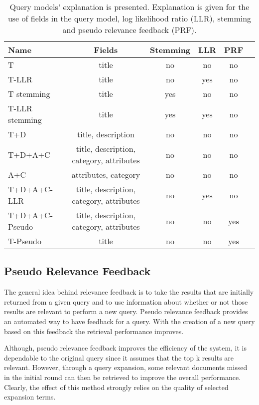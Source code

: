\begin{table}[H]
\begin{center}
\scriptsize
\caption{Query models' explanation is presented. Explanation is given for the use of fields in the query model, log likelihood ratio (LLR), stemming and pseudo relevance feedback (PRF).}
\begin{tabular}{lccccr}
\midrule
Name & Fields & Stemming & LLR & PRF \\
\midrule
T & title & no & no & no \\
T-LLR & title & no & yes & no \\
T stemming & title & yes & no & no \\
T-LLR stemming & title & yes & yes & no \\
T+D  & title, description & no & no & no \\
T+D+A+C & title, description, category, attributes & no & no & no \\
A+C & attributes, category & no & no & no \\
T+D+A+C-LLR & title, description, category, attributes & no & yes & no \\
T+D+A+C-Pseudo & title, description, category, attributes & no & no & yes \\
T-Pseudo & title & no & no & yes\\
\bottomrule
\end{tabular}
\end{center}
\end{table}

\subsection{Pseudo Relevance Feedback}

The general idea behind relevance feedback is to take the results that are initially returned from a given query and to use information about whether or not those results are relevant to perform a new query. Pseudo relevance feedback provides an automated way to have feedback for a query. With the creation of a new query based on this feedback the retrieval performance improves.

Although, pseudo relevance feedback improves the efficiency of the system, it is dependable to the original query since it assumes that the top k results are relevant. However, through a query expansion, some relevant documents missed in the initial round can then be retrieved to improve the overall performance. Clearly, the effect of this method strongly relies on the quality of selected expansion terms.

